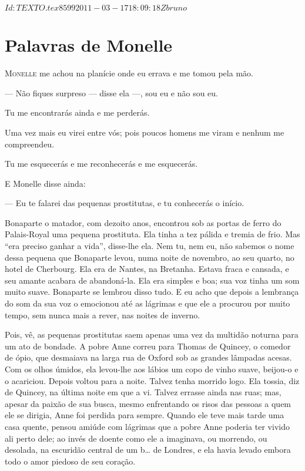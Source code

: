 \SVN $Id: TEXTO.tex 8599 2011-03-17 18:09:18Z bruno $

\chapter{Palavras de Monelle}  

\textsc{Monelle} me achou na planície onde eu errava e me tomou pela mão.

--- Não fiques surpreso --- disse ela ---, sou eu e não sou eu.

Tu me encontrarás ainda e me perderás.

Uma vez mais eu virei entre vós; pois poucos homens me viram e nenhum
me compreendeu.

Tu me esquecerás e me reconhecerás e me esquecerás.

E Monelle disse ainda: 

--- Eu te falarei das pequenas prostitutas, e tu conhecerás o início.

Bonaparte o matador, com dezoito anos, encontrou sob as portas de ferro
do Palais-Royal uma pequena prostituta. Ela tinha a tez pálida e tremia de
frio. Mas “era preciso ganhar a vida”, disse-lhe ela. Nem tu, nem eu, não
sabemos o nome dessa pequena que Bonaparte levou, numa noite de novembro,
ao seu quarto, no hotel de Cherbourg. Ela era de Nantes, na Bretanha.
Estava fraca e cansada, e seu amante acabara de abandoná-la. Ela era
simples e boa; sua voz tinha um som muito suave. Bonaparte se lembrou disso
tudo. E eu acho que depois a lembrança do som da sua voz o emocionou até
as lágrimas e que ele a procurou por muito tempo, sem nunca mais a rever,
nas noites de inverno.

Pois, vê, as pequenas prostitutas saem apenas uma vez da multidão
noturna para um ato de bondade. A pobre Anne correu para Thomas de
Quincey, o comedor de ópio, que desmaiava na larga rua de Oxford sob as
grandes lâmpadas acesas. Com os olhos úmidos, ela levou-lhe aos lábios um
copo de vinho suave, beijou-o e o acariciou. Depois voltou para a noite.
Talvez tenha morrido logo. Ela tossia, diz de Quincey, na última noite em
que a vi. Talvez errasse ainda nas ruas; mas, apesar da paixão de sua
busca, mesmo enfrentando os risos das pessoas a quem ele se dirigia, Anne
foi perdida para sempre. Quando ele teve mais tarde uma casa quente, pensou
amiúde com lágrimas que a pobre Anne poderia ter vivido ali perto
dele; ao invés de doente como ele a imaginava, ou morrendo, ou desolada,
na escuridão central de um b\ldots{} de Londres, e ela havia levado 
embora todo o amor piedoso de seu coração.

